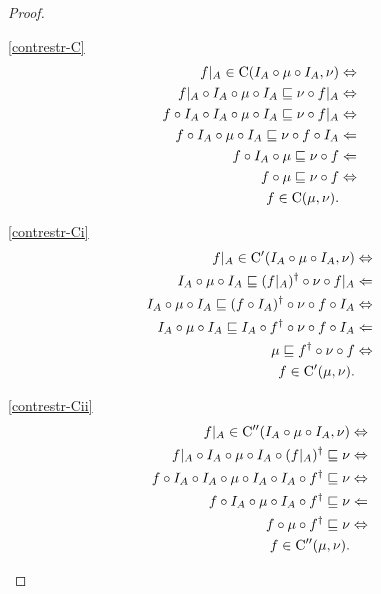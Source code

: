 \begin{proof}
~
\begin{widedisorder}
\item [{\ref{contrestr-C}}] ~
\begin{align*}
f|_{A}\in\mathrm{C}(I_{A}\circ\mu\circ I_{A},\nu) & \Leftrightarrow\\
f|_{A}\circ I_{A}\circ\mu\circ I_{A}\sqsubseteq\nu\circ f|_{A} & \Leftrightarrow\\
f\circ I_{A}\circ I_{A}\circ\mu\circ I_{A}\sqsubseteq\nu\circ f|_{A} & \Leftrightarrow\\
f\circ I_{A}\circ\mu\circ I_{A}\sqsubseteq\nu\circ f\circ I_{A} & \Leftarrow\\
f\circ I_{A}\circ\mu\sqsubseteq\nu\circ f & \Leftarrow\\
f\circ\mu\sqsubseteq\nu\circ f & \Leftrightarrow\\
f\in\mathrm{C}(\mu,\nu).
\end{align*}

\item [{\ref{contrestr-Ci}}] ~
\begin{align*}
f|_{A}\in\mathrm{C}'(I_{A}\circ\mu\circ I_{A},\nu) & \Leftrightarrow\\
I_{A}\circ\mu\circ I_{A}\sqsubseteq(f|_{A})^{\dagger}\circ\nu\circ f|_{A} & \Leftarrow\\
I_{A}\circ\mu\circ I_{A}\sqsubseteq(f\circ I_{A})^{\dagger}\circ\nu\circ f\circ I_{A} & \Leftrightarrow\\
I_{A}\circ\mu\circ I_{A}\sqsubseteq I_{A}\circ f^{\dagger}\circ\nu\circ f\circ I_{A} & \Leftarrow\\
\mu\sqsubseteq f^{\dagger}\circ\nu\circ f & \Leftrightarrow\\
f\in\mathrm{C}'(\mu,\nu).
\end{align*}

\item [{\ref{contrestr-Cii}}] ~
\begin{align*}
f|_{A}\in\mathrm{C}''(I_{A}\circ\mu\circ I_{A},\nu) & \Leftrightarrow\\
f|_{A}\circ I_{A}\circ\mu\circ I_{A}\circ(f|_{A})^{\dagger}\sqsubseteq\nu & \Leftrightarrow\\
f\circ I_{A}\circ I_{A}\circ\mu\circ I_{A}\circ I_{A}\circ f^{\dagger}\sqsubseteq\nu & \Leftrightarrow\\
f\circ I_{A}\circ\mu\circ I_{A}\circ f^{\dagger}\sqsubseteq\nu & \Leftarrow\\
f\circ\mu\circ f^{\dagger}\sqsubseteq\nu & \Leftrightarrow\\
f\in\mathrm{C}''(\mu,\nu).
\end{align*}
\end{widedisorder}
\end{proof}


